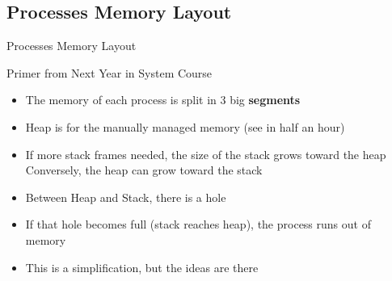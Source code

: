 \begin{Coupe}
\subsection{Processes Memory Layout}
\begin{frame}{Processes Memory Layout}
  \begin{block}{Primer from Next Year in System Course}
    \begin{itemize}
    \item The memory of each process is split in 3 big \textbf{\alert{segments}}
    \item Heap is for the manually managed memory (see in half an hour)
    \item<2-> If more stack frames needed, the size of the stack grows toward
      the heap\\
      Conversely, the heap can grow toward the stack
    \item<3-> Between Heap and Stack, there is a hole 
    \item<3-> If that hole becomes full (stack reaches heap), the process runs out of memory
    \item This is a simplification, but the ideas are there
    \end{itemize}

    \begin{center}
    \end{center}
  \end{block}\vspace{-1.5\baselineskip}


\end{frame}
\end{Coupe}
